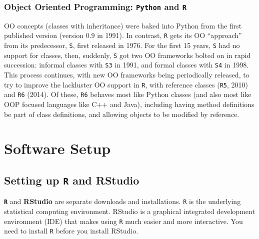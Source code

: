 \documentclass[
  12pt, krantz2,
]{krantz}
\newcommand{\passthrough}[1]{#1}
\newcommand{\1}{\mathbbm{1}}
\theoremstyle{definition}
\theoremstyle{definition}
\theoremstyle{definition}
\theoremstyle{definition}
\theoremstyle{remark}
\begin{document}
\hypertarget{object-oriented-programming-python-and-r}{%
\subsection*{\texorpdfstring{Object Oriented Programming: \texttt{Python} and \texttt{R}}{Object Oriented Programming: Python and R}}\label{object-oriented-programming-python-and-r}}


OO concepts (classes with inheritance) were baked into Python from the first
published version (version 0.9 in 1991). In contrast, \passthrough{\lstinline!R!} gets its OO ``approach''
from its predecessor, \passthrough{\lstinline!S!}, first released in 1976. For the first 15 years, \passthrough{\lstinline!S!}
had no support for classes, then, suddenly, \passthrough{\lstinline!S!} got two OO frameworks bolted on
in rapid succession: informal classes with \passthrough{\lstinline!S3!} in 1991, and formal classes with
\passthrough{\lstinline!S4!} in 1998. This process continues, with new OO frameworks being periodically
released, to try to improve the lackluster OO support in \passthrough{\lstinline!R!}, with reference
classes (\passthrough{\lstinline!R5!}, 2010) and \passthrough{\lstinline!R6!} (2014). Of these, \passthrough{\lstinline!R6!} behaves most like Python
classes (and also most like OOP focused languages like C++ and Java), including
having method definitions be part of class definitions, and allowing objects to
be modified by reference.

\hypertarget{setup}{%
\chapter{Software Setup}\label{setup}}

\hypertarget{setting-up-r-and-rstudio}{%
\section{\texorpdfstring{Setting up \texttt{R} and RStudio}{Setting up R and RStudio}}\label{setting-up-r-and-rstudio}}

\textbf{\passthrough{\lstinline!R!}} and \textbf{RStudio} are separate downloads and installations. \passthrough{\lstinline!R!} is the
underlying statistical computing environment. RStudio is a graphical integrated
development environment (IDE) that makes using \passthrough{\lstinline!R!} much easier and more
interactive. You need to install \passthrough{\lstinline!R!} before you install RStudio.
\end{document}
